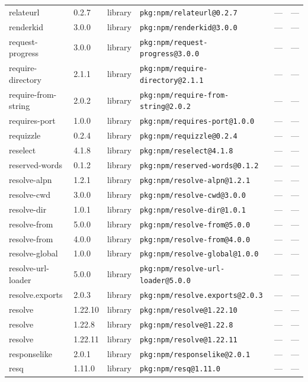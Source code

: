 \documentclass[11pt]{article}
\begin{document}
\begin{longtable}{|l|l|l|p{2.2cm}|l|p{4cm}|}
relateurl & 0.2.7 & library & \texttt{pkg:npm/relateurl@0.2.7} & — & — \\
renderkid & 3.0.0 & library & \texttt{pkg:npm/renderkid@3.0.0} & — & — \\
request-progress & 3.0.0 & library & \texttt{pkg:npm/request-progress@3.0.0} & — & — \\
require-directory & 2.1.1 & library & \texttt{pkg:npm/require-directory@2.1.1} & — & — \\
require-from-string & 2.0.2 & library & \texttt{pkg:npm/require-from-string@2.0.2} & — & — \\
requires-port & 1.0.0 & library & \texttt{pkg:npm/requires-port@1.0.0} & — & — \\
requizzle & 0.2.4 & library & \texttt{pkg:npm/requizzle@0.2.4} & — & — \\
reselect & 4.1.8 & library & \texttt{pkg:npm/reselect@4.1.8} & — & — \\
reserved-words & 0.1.2 & library & \texttt{pkg:npm/reserved-words@0.1.2} & — & — \\
resolve-alpn & 1.2.1 & library & \texttt{pkg:npm/resolve-alpn@1.2.1} & — & — \\
resolve-cwd & 3.0.0 & library & \texttt{pkg:npm/resolve-cwd@3.0.0} & — & — \\
resolve-dir & 1.0.1 & library & \texttt{pkg:npm/resolve-dir@1.0.1} & — & — \\
resolve-from & 5.0.0 & library & \texttt{pkg:npm/resolve-from@5.0.0} & — & — \\
resolve-from & 4.0.0 & library & \texttt{pkg:npm/resolve-from@4.0.0} & — & — \\
resolve-global & 1.0.0 & library & \texttt{pkg:npm/resolve-global@1.0.0} & — & — \\
resolve-url-loader & 5.0.0 & library & \texttt{pkg:npm/resolve-url-loader@5.0.0} & — & — \\
resolve.exports & 2.0.3 & library & \texttt{pkg:npm/resolve.exports@2.0.3} & — & — \\
resolve & 1.22.10 & library & \texttt{pkg:npm/resolve@1.22.10} & — & — \\
resolve & 1.22.8 & library & \texttt{pkg:npm/resolve@1.22.8} & — & — \\
resolve & 1.22.11 & library & \texttt{pkg:npm/resolve@1.22.11} & — & — \\
responselike & 2.0.1 & library & \texttt{pkg:npm/responselike@2.0.1} & — & — \\
resq & 1.11.0 & library & \texttt{pkg:npm/resq@1.11.0} & — & — \\

\end{longtable}
\end{document}
